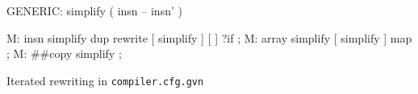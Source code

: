 \centering

  \begin{factorcode}
    GENERIC: simplify ( insn -- insn' )

    M: insn simplify dup rewrite [ simplify ] [ ] ?if ;
    M: array simplify [ simplify ] map ;
    M: ##copy simplify ;
  \end{factorcode}

\caption{Iterated rewriting in \texttt{compiler.cfg.gvn}}
